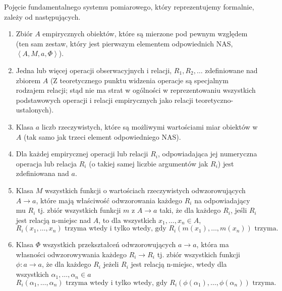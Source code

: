 \documentclass[12pt,a4paper]{report}
\newcommand{\tuple}[1]{\left\langle {#1} \right\rangle}
\begin{document}
Pojęcie fundamentalnego systemu pomiarowego, który reprezentujemy formalnie, zależy od następujących.
\begin{enumerate}
\item
Zbiór $A$ empirycznych obiektów, które są mierzone pod pewnym względem (ten sam zestaw, który jest pierwszym elementem odpowiednich NAS, $\tuple{A,M,a,\Phi}$).
\item
Jedna lub więcej operacji obserwacyjnych i relacji, $R_{1},R_{2},\dots$ zdefiniowane nad zbiorem $A$ (Z teoretycznego punktu widzenia operacje są
specjalnym rodzajem relacji; stąd nie ma strat w ogólności w reprezentowaniu wszystkich podstawowych operacji i relacji empirycznych jako relacji teoretyczno-ustalonych).
\item
Klasa $a$ liczb rzeczywistych, które są możliwymi wartościami miar obiektów w $A$ (tak samo jak trzeci element odpowiedniego NAS).
\item
Dla każdej empirycznej operacji lub relacji $R_{i}$, odpowiadająca jej numeryczna operacja lub relacja $R_{i}$ (o takiej samej liczbie argumentów jak $R_{i}$) jest zdefiniowana nad $a$.
\item
Klasa $M$ wszystkich funkcji o wartościach rzeczywistych odwzorowujących $A\to a$, które mają właściwość odwzorowania każdego $R_{i}$ na odpowiadający mu $R_{i}$ tj. zbiór wszystkich funkcji $m$ z $A\to a$ taki, że dla każdego $R_{i}$, jeśli $R_{i}$ jest relacją n-miejsc nad $A$, to dla wszystkich $x_{1},\dots, x_{n} \in A$,
\begin{equation*}
R_{i}(x_{1},\dots,x_{n}) \textrm{ trzyma wtedy i tylko wtedy, gdy } R_{i}(m(x_{1}),\dots,m(x_{n})) \textrm{ trzyma}.
\end{equation*}
\item
Klasa $\Phi$ wszystkich przekształceń odwzorowujących $a\to a$, która ma własności odwzorowywania każdego $R_{i} \to R_{i}$ tj. zbiór wszystkich funkcji $\phi: a \to a$, że dla każdego $R_{i}$ jeżeli $R_{i}$ jest relacją n-miejsc, wtedy dla wszystkich $\alpha_{1},\dots,\alpha_{n}\in a$
\begin{equation*}
R_{i}(\alpha_{1},\dots,\alpha_{n}) \textrm{ trzyma wtedy i tylko wtedy, gdy } R_{i}(\phi(\alpha_{1}),\dots,\phi(\alpha_{n})) \textrm{ trzyma}.
\end{equation*} 
\end{enumerate}
\end{document}
